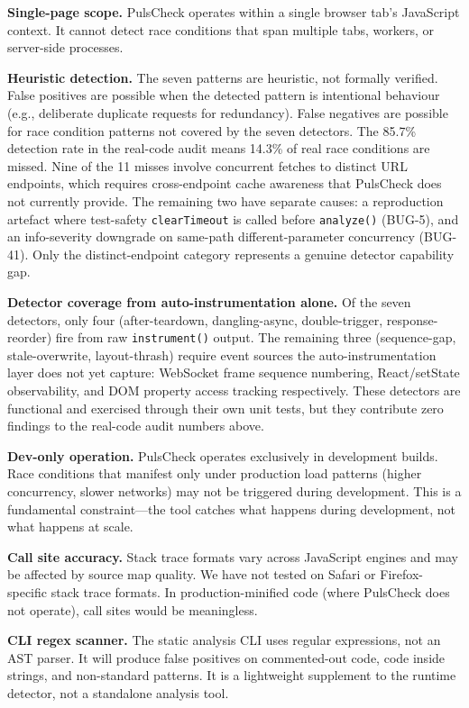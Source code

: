 \documentclass[11pt,a4paper]{article}
\begin{document}
\textbf{Single-page scope.} PulsCheck operates within a single browser tab's JavaScript context. It cannot detect race conditions that span multiple tabs, workers, or server-side processes.

\textbf{Heuristic detection.} The seven patterns are heuristic, not formally verified. False positives are possible when the detected pattern is intentional behaviour (e.g., deliberate duplicate requests for redundancy). False negatives are possible for race condition patterns not covered by the seven detectors. The 85.7\% detection rate in the real-code audit means 14.3\% of real race conditions are missed. Nine of the 11 misses involve concurrent fetches to distinct URL endpoints, which requires cross-endpoint cache awareness that PulsCheck does not currently provide. The remaining two have separate causes: a reproduction artefact where test-safety \texttt{clearTimeout} is called before \texttt{analyze()} (BUG-5), and an info-severity downgrade on same-path different-parameter concurrency (BUG-41). Only the distinct-endpoint category represents a genuine detector capability gap.

\textbf{Detector coverage from auto-instrumentation alone.} Of the seven detectors, only four (after-teardown, dangling-async, double-trigger, response-reorder) fire from raw \texttt{instrument()} output. The remaining three (sequence-gap, stale-overwrite, layout-thrash) require event sources the auto-instrumentation layer does not yet capture: WebSocket frame sequence numbering, React/setState observability, and DOM property access tracking respectively. These detectors are functional and exercised through their own unit tests, but they contribute zero findings to the real-code audit numbers above.

\textbf{Dev-only operation.} PulsCheck operates exclusively in development builds. Race conditions that manifest only under production load patterns (higher concurrency, slower networks) may not be triggered during development. This is a fundamental constraint---the tool catches what happens during development, not what happens at scale.

\textbf{Call site accuracy.} Stack trace formats vary across JavaScript engines and may be affected by source map quality. We have not tested on Safari or Firefox-specific stack trace formats. In production-minified code (where PulsCheck does not operate), call sites would be meaningless.

\textbf{CLI regex scanner.} The static analysis CLI uses regular expressions, not an AST parser. It will produce false positives on commented-out code, code inside strings, and non-standard patterns. It is a lightweight supplement to the runtime detector, not a standalone analysis tool.
\end{document}
